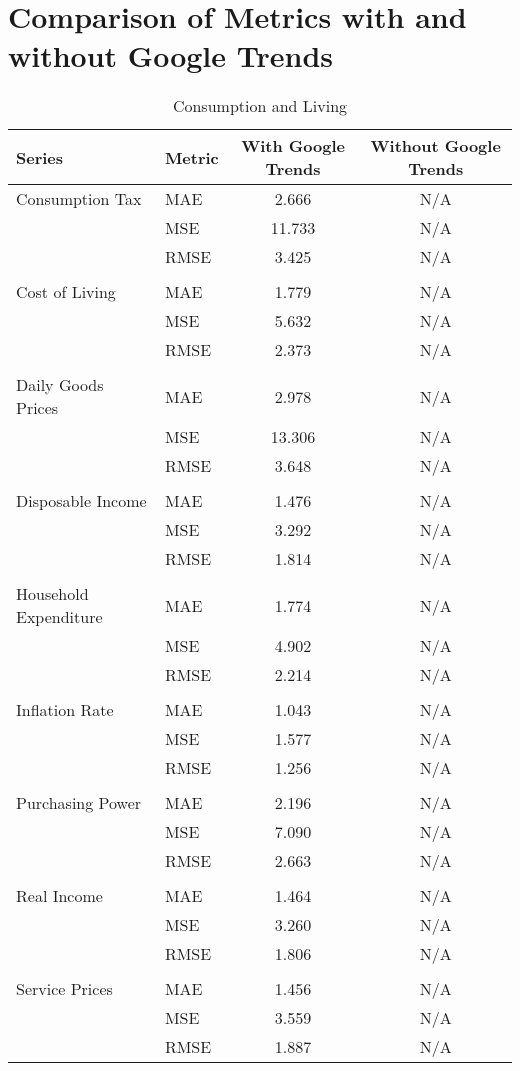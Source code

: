 \documentclass[a4paper,12pt]{article}
\begin{document}
\section*{Comparison of Metrics with and without Google Trends}

\begin{table}
\caption{Consumption and Living}
\label{tab:metrics_comparison_Consumption_and_Living}
\begin{tabular}{llcc}
\toprule
Series & Metric & With Google Trends & Without Google Trends \\
\midrule
Consumption Tax & MAE & 2.666 & N/A \\
 & MSE & 11.733 & N/A \\
 & RMSE & 3.425 & N/A \\
\arrayrulecolor{black!30}\midrule &  &  &  \\
Cost of Living & MAE & 1.779 & N/A \\
 & MSE & 5.632 & N/A \\
 & RMSE & 2.373 & N/A \\
\arrayrulecolor{black!30}\midrule &  &  &  \\
Daily Goods Prices & MAE & 2.978 & N/A \\
 & MSE & 13.306 & N/A \\
 & RMSE & 3.648 & N/A \\
\arrayrulecolor{black!30}\midrule &  &  &  \\
Disposable Income & MAE & 1.476 & N/A \\
 & MSE & 3.292 & N/A \\
 & RMSE & 1.814 & N/A \\
\arrayrulecolor{black!30}\midrule &  &  &  \\
Household Expenditure & MAE & 1.774 & N/A \\
 & MSE & 4.902 & N/A \\
 & RMSE & 2.214 & N/A \\
\arrayrulecolor{black!30}\midrule &  &  &  \\
Inflation Rate & MAE & 1.043 & N/A \\
 & MSE & 1.577 & N/A \\
 & RMSE & 1.256 & N/A \\
\arrayrulecolor{black!30}\midrule &  &  &  \\
Purchasing Power & MAE & 2.196 & N/A \\
 & MSE & 7.090 & N/A \\
 & RMSE & 2.663 & N/A \\
\arrayrulecolor{black!30}\midrule &  &  &  \\
Real Income & MAE & 1.464 & N/A \\
 & MSE & 3.260 & N/A \\
 & RMSE & 1.806 & N/A \\
\arrayrulecolor{black!30}\midrule &  &  &  \\
Service Prices & MAE & 1.456 & N/A \\
 & MSE & 3.559 & N/A \\
 & RMSE & 1.887 & N/A \\
\bottomrule
\end{tabular}
\end{table}
\end{document}
